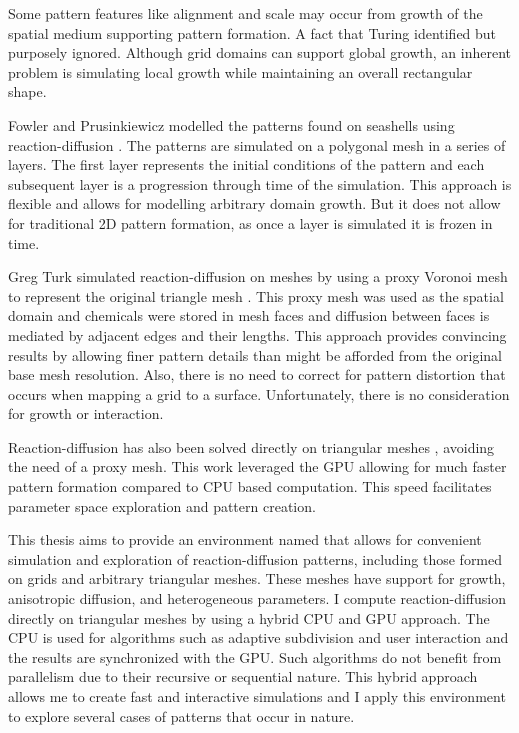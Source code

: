 Some pattern features like alignment and scale may occur from growth of the spatial medium supporting pattern formation. A fact that Turing identified but purposely ignored. Although grid domains can support global growth, an inherent problem is simulating local growth while maintaining an overall rectangular shape. 

Fowler and Prusinkiewicz modelled the patterns found on seashells using reaction-diffusion \cite{fowler1992modeling}. The patterns are simulated on a polygonal mesh in a series of layers. The first layer represents the initial conditions of the pattern and each subsequent layer is a progression through time of the simulation. This approach is flexible and allows for modelling arbitrary domain growth. But it does not allow for traditional 2D pattern formation, as once a layer is simulated it is frozen in time.

Greg Turk simulated reaction-diffusion on meshes by using a proxy Voronoi mesh to represent the original triangle mesh \cite{Turk1991}. This proxy mesh was used as the spatial domain and chemicals were stored in mesh faces and diffusion between faces is mediated by adjacent edges and their lengths. This approach provides convincing results by allowing finer pattern details than might be afforded from the original base mesh resolution. Also, there is no need to correct for pattern distortion that occurs when mapping a grid to a surface. Unfortunately, there is no consideration for growth or interaction. 

Reaction-diffusion has also been solved directly on triangular meshes \cite{Descombes2016}, avoiding the need of a proxy mesh. This work leveraged the GPU allowing for much faster pattern formation compared to CPU based computation. This speed facilitates parameter space exploration and pattern creation. 

This thesis aims to provide an environment named \ProgramName{} that allows for convenient simulation and exploration of reaction-diffusion patterns, including those formed on grids and arbitrary triangular meshes. These meshes have support for growth, anisotropic diffusion, and heterogeneous parameters. I compute reaction-diffusion directly on triangular meshes by using a hybrid CPU and GPU approach. The CPU is used for algorithms such as adaptive subdivision and user interaction and the results are synchronized with the GPU. Such algorithms do not benefit from parallelism due to their recursive or sequential nature. This hybrid approach allows me to create fast and interactive simulations and I apply this environment to explore several cases of patterns that occur in nature.

